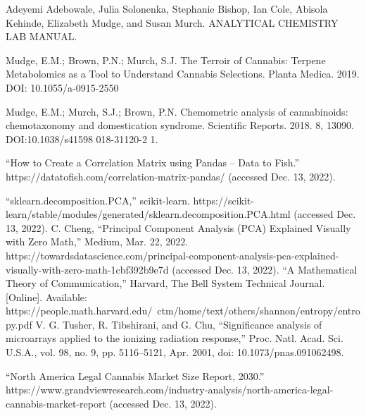 \documentclass{article}
\begin{document}
\begin{thebibliography}{9}
Adeyemi Adebowale, Julia Solonenka, Stephanie Bishop, Ian Cole, Abisola Kehinde, Elizabeth Mudge, and Susan Murch. ANALYTICAL  CHEMISTRY  LAB MANUAL.

Mudge, E.M.; Brown, P.N.; Murch, S.J. The Terroir of Cannabis: Terpene Metabolomics as a Tool
 to Understand Cannabis Selections. Planta Medica. 2019. DOI: 10.1055/a-0915-2550

Mudge, E.M.; Murch, S.J.; Brown, P.N. Chemometric analysis of cannabinoids: chemotaxonomy
 and domestication syndrome. Scientific Reports. 2018. 8, 13090. DOI:10.1038/s41598
 018-31120-2 1. 

“How to Create a Correlation Matrix using Pandas – Data to Fish.” https://datatofish.com/correlation-matrix-pandas/ (accessed Dec. 13, 2022).

“sklearn.decomposition.PCA,” scikit-learn. https://scikit-learn/stable/modules/generated/sklearn.decomposition.PCA.html (accessed Dec. 13, 2022).
C. Cheng, “Principal Component Analysis (PCA) Explained Visually with Zero Math,” Medium, Mar. 22, 2022. https://towardsdatascience.com/principal-component-analysis-pca-explained-visually-with-zero-math-1cbf392b9e7d (accessed Dec. 13, 2022).
“A Mathematical Theory of Communication,” Harvard, The Bell System Technical Journal. [Online]. Available: https://people.math.harvard.edu/~ctm/home/text/others/shannon/entropy/entropy.pdf
V. G. Tusher, R. Tibshirani, and G. Chu, “Significance analysis of microarrays applied to the ionizing radiation response,” Proc. Natl. Acad. Sci. U.S.A., vol. 98, no. 9, pp. 5116–5121, Apr. 2001, doi: 10.1073/pnas.091062498.


“North America Legal Cannabis Market Size Report, 2030.” https://www.grandviewresearch.com/industry-analysis/north-america-legal-cannabis-market-report (accessed Dec. 13, 2022).

\end{thebibliography}
\end{document}
